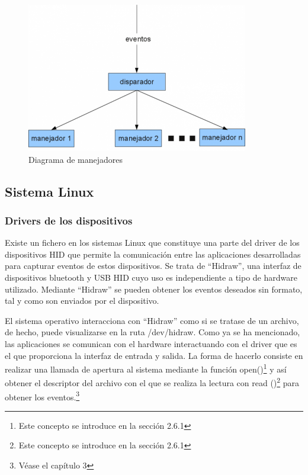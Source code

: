 \begin{figure}
\centering
\includegraphics[scale = 0.7]{capitulo_02/figuras_dir/disparador.jpg}
\caption{Diagrama de manejadores}
\end{figure}

\subsection{Sistema Linux} \label{s2_1_3}

\subsubsection{Drivers de los dispositivos}\label{s2_1_3_1}

Existe un fichero en los sistemas Linux que constituye una parte del driver de los dispositivos HID que permite la comunicación entre las aplicaciones desarrolladas para capturar eventos de estos dispositivos. Se trata de ``Hidraw'', una interfaz de dispositivos bluetooth y USB HID cuyo uso es independiente a tipo de hardware utilizado. Mediante ``Hidraw'' se pueden obtener los eventos deseados sin formato, tal y como son enviados por el dispositivo. 

El sistema operativo interacciona con ``Hidraw'' como si se tratase de un archivo, de hecho, puede visualizarse en la ruta /dev/hidraw. Como ya se ha mencionado, las aplicaciones se comunican con el hardware interactuando con el driver que es el que proporciona la interfaz de entrada y salida. La forma de hacerlo consiste en realizar una llamada de apertura al sistema mediante la función open()\footnote{Este concepto se introduce en la sección 2.6.1} y así obtener el descriptor del archivo con el que se realiza la lectura con read ()\footnote{Este concepto se introduce en la sección 2.6.1} para obtener los eventos.\footnote{Véase el capítulo 3}

